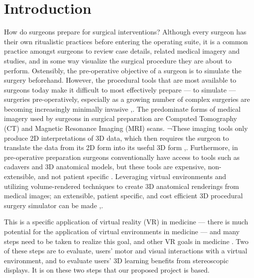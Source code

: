 \documentclass[]{spie}  %
\begin{document}
\section{Introduction}
How do surgeons prepare for surgical interventions? Although every surgeon has their own ritualistic practices before entering the operating suite, it is a common practice amongst surgeons to review case details, related medical imagery and studies, and in some way visualize the surgical procedure they are about to perform. Ostensibly, the pre-operative objective of a surgeon is to simulate the surgery beforehand. However, the procedural tools that are most available to surgeons today make it difficult to most effectively prepare --- to simulate --- surgeries pre-operatively, especially as a growing number of complex surgeries are becoming increasingly minimally invasive \cite{kang2014stereoscopic},\cite{chan2013virtual}. The predominate forms of medical imagery used by surgeons in surgical preparation are Computed Tomography (CT) and Magnetic Resonance Imaging (MRI) scans. ¬These imaging tools only produce 2D interpretations of 3D data, which then requires the surgeon to translate the data from its 2D form into its useful 3D form \cite{ nam2012application},\cite{vaapenstad2013procedural}. Furthermore, in pre-operative preparation surgeons conventionally have access to tools such as cadavers and 3D anatomical models, but these tools are expensive, non-extensible, and not patient specific \cite{marescaux1998virtual}. Leveraging virtual environments and utilizing volume-rendered techniques to create 3D anatomical renderings from medical images; an extensible, patient specific, and cost efficient 3D procedural surgery simulator can be made \cite{ vaapenstad2013procedural},\cite{messier2016interactive}.

This is a specific application of virtual reality (VR) in medicine --- there is much potential for the application of virtual environments in medicine --- and many steps need to be taken to realize this goal, and other VR goals in medicine \cite{ chan2013virtual}. Two of these steps are to evaluate, users’ motor and visual interactions with a virtual environment, and to evaluate users’ 3D learning benefits from stereoscopic displays. It is on these two steps that our proposed project is based. 
\end{document}
